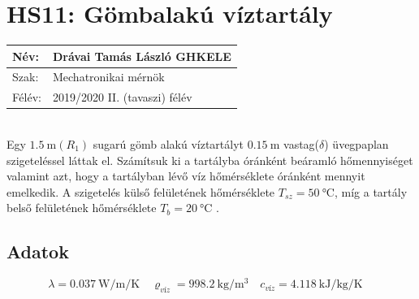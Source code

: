 \section*{HS11: Gömbalakú víztartály}

\begin{tabular}{ | p{2cm} | p{14cm} | } 
	\hline
	Név: & Drávai Tamás László GHKELE\\ 
	\hline
	Szak: & Mechatronikai mérnök \\ 
	\hline
	Félév: & 2019/2020 II. (tavaszi) félév \\ 
	\hline
\end{tabular}
\vspace{4mm}
\\Egy $\SI{1,5}{\meter} (R_1)$ sugarú gömb alakú víztartályt $\SI{0,15}{\meter}$ vastag($\delta$) üvegpaplan szigeteléssel láttak el. Számítsuk ki a tartályba óránként beáramló hőmennyiséget valamint azt, hogy a tartályban lévő víz hőmérséklete óránként mennyit emelkedik. A szigetelés külső felületének hőmérséklete $T_{sz}=\SI{50}{\celsius}$, míg a tartály belső felületének hőmérséklete $T_{b}=\SI{20}{\celsius}$ .
\subsection*{Adatok}
\begin{equation*}
\lambda=\SI[per-mode=fraction]{0,037}{\watt\per\meter\per\kelvin} \quad 
\varrho_{víz} =\SI[per-mode=fraction]{998,2}{\kilogram\per\cubic\meter}\quad 
c_{\textit{víz}}=\SI[per-mode=fraction]{4,118}{\kJ \per \kilogram\per\kelvin}\quad
\end{equation*}
